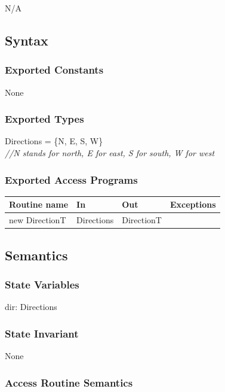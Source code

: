 \documentclass[12pt]{article}
\begin{document}
N/A

\subsection* {Syntax}

\subsubsection* {Exported Constants}

None

\subsubsection* {Exported Types}

Directions = \{N, E, S, W\}\\

\noindent \textit{//N stands for north, E for east, S for south, W for west}

\subsubsection* {Exported Access Programs}

\begin{tabular}{| l | l | l | l |}
	\hline
	\textbf{Routine name} & \textbf{In} & \textbf{Out} & \textbf{Exceptions}\\
	\hline
	new DirectionT & Directions & DirectionT & ~\\
	\hline
\end{tabular}

\subsection* {Semantics}

\subsubsection* {State Variables}

dir: Directions

\subsubsection* {State Invariant}

None

\subsubsection* {Access Routine Semantics}
\end{document}
